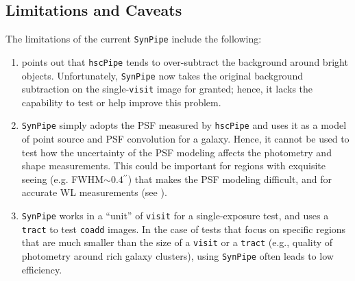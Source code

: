 \documentclass[useamsfonts]{pasj01}
\def\asec{$^{\prime\prime}$}
\def\hscpipe{\texttt{hscPipe}}
\def\synpipe{\texttt{SynPipe}}
\def\coadd{\texttt{coadd}}
\def\tract{\texttt{tract}}
\def\visit{\texttt{visit}}
\begin{document}
\subsection{Limitations and Caveats}
    \label{ssec:caveats}
    
    The limitations of the current \synpipe{} include the following:

    \begin{enumerate}

        \item \citet{HSCDR1} points out that \hscpipe{} tends to over-subtract the
            background around bright objects.
            Unfortunately, \synpipe{} now takes the original background subtraction on
            the single-\visit{} image for granted; hence, it lacks the capability to
            test or help improve this problem.

        \item  \synpipe{} simply adopts the PSF measured by \hscpipe{} and
            uses it as a model of point source and PSF convolution for a galaxy.
            Hence, it cannot be used to test how the uncertainty of the PSF modeling
            affects the photometry and shape measurements.
            This could be important for regions with exquisite seeing 
            (e.g. FWHM${\sim}0.4$\asec{}) that makes the
            PSF modeling difficult, and for accurate WL measurements 
            (see \citealt{HSCDR1}).

        \item \synpipe{} works in a ``unit'' of \visit{} for a single-exposure
            test, and uses a \tract{} to test \coadd{} images.
            In the case of tests that focus on specific regions that are much smaller 
            than the size of a \visit{} or a \tract{} (e.g., quality of photometry
            around rich galaxy clusters), using \synpipe{} often leads to
            low efficiency.

    \end{enumerate}
\end{document}
